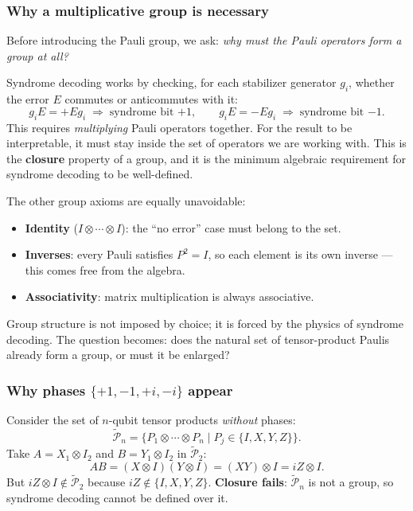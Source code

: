 \documentclass[11pt, a4paper]{article}
\theoremstyle{definition}
\theoremstyle{plain}
\theoremstyle{remark}
\begin{document}
\subsubsection{Why a multiplicative group is necessary}

Before introducing the Pauli group, we ask: \emph{why must the Pauli
operators form a group at all?}

Syndrome decoding works by checking, for each stabilizer generator $g_i$,
whether the error $E$ commutes or anticommutes with it:
\[
  g_i E = +E g_i \;\Rightarrow\; \text{syndrome bit } {+1}, \qquad
  g_i E = -E g_i \;\Rightarrow\; \text{syndrome bit } {-1}.
\]
This requires \emph{multiplying} Pauli operators together.  For the result
to be interpretable, it must stay inside the set of operators we are working
with.  This is the \textbf{closure} property of a group, and it is the
minimum algebraic requirement for syndrome decoding to be well-defined.

The other group axioms are equally unavoidable:
\begin{itemize}
  \item \textbf{Identity} ($I\otimes\cdots\otimes I$): the ``no error''
        case must belong to the set.
  \item \textbf{Inverses}: every Pauli satisfies $P^2 = I$, so each
        element is its own inverse --- this comes free from the algebra.
  \item \textbf{Associativity}: matrix multiplication is always
        associative.
\end{itemize}
Group structure is not imposed by choice; it is forced by the physics of
syndrome decoding.  The question becomes: does the natural set of
tensor-product Paulis already form a group, or must it be enlarged?

\subsubsection{Why phases $\{+1,-1,+i,-i\}$ appear}

Consider the set of $n$-qubit tensor products \emph{without} phases:
\[
  \widetilde{\mathcal{P}}_n
  = \bigl\{ P_1 \otimes \cdots \otimes P_n \;\big|\; P_j \in \{I,X,Y,Z\} \bigr\}.
\]
Take $A = X_1 \otimes I_2$ and $B = Y_1 \otimes I_2$ in
$\widetilde{\mathcal{P}}_2$:
\[
  AB = (X\otimes I)(Y\otimes I) = (XY)\otimes I = iZ\otimes I.
\]
But $iZ\otimes I \notin \widetilde{\mathcal{P}}_2$ because $iZ \notin
\{I,X,Y,Z\}$.  \textbf{Closure fails}: $\widetilde{\mathcal{P}}_n$ is not
a group, so syndrome decoding cannot be defined over it.
\end{document}
